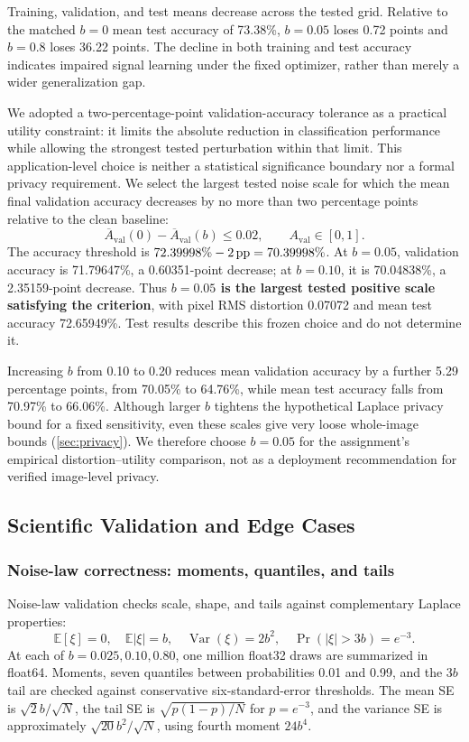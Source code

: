 Training, validation, and test means decrease across the tested grid. Relative to the matched $b=0$ mean test accuracy of 73.38\%, $b=0.05$ loses 0.72 points and $b=0.8$ loses 36.22 points. The decline in both training and test accuracy indicates impaired signal learning under the fixed optimizer, rather than merely a wider generalization gap.

We adopted a two-percentage-point validation-accuracy tolerance as a practical utility constraint: it limits the absolute reduction in classification performance while allowing the strongest tested perturbation within that limit. This application-level choice is neither a statistical significance boundary nor a formal privacy requirement. We select the largest tested noise scale for which the mean final validation accuracy decreases by no more than two percentage points relative to the clean baseline:
\begin{equation}
\overline{A}_{\mathrm{val}}(0)-\overline{A}_{\mathrm{val}}(b)\le0.02,
\qquad A_{\mathrm{val}}\in[0,1].\label{eq:selection}
\end{equation}
The accuracy threshold is $72.39998\%-2\,\text{pp}=70.39998\%$. At $b=0.05$, validation accuracy is 71.79647\%, a 0.60351-point decrease; at $b=0.10$, it is 70.04838\%, a 2.35159-point decrease. Thus \textbf{$b=0.05$ is the largest tested positive scale satisfying the criterion}, with pixel RMS distortion 0.07072 and mean test accuracy 72.65949\%. Test results describe this frozen choice and do not determine it.

Increasing $b$ from 0.10 to 0.20 reduces mean validation accuracy by a further 5.29 percentage points, from 70.05\% to 64.76\%, while mean test accuracy falls from 70.97\% to 66.06\%. Although larger $b$ tightens the hypothetical Laplace privacy bound for a fixed sensitivity, even these scales give very loose whole-image bounds (\cref{sec:privacy}). We therefore choose $b=0.05$ for the assignment's empirical distortion--utility comparison, not as a deployment recommendation for verified image-level privacy.

\subsection{Scientific Validation and Edge Cases}\label{sec:p2validation}
\subsubsection{Noise-law correctness: moments, quantiles, and tails}
Noise-law validation checks scale, shape, and tails against complementary Laplace properties:
\begin{equation}
\mathbb{E}[\xi]=0,\quad \mathbb{E}|\xi|=b,\quad
\operatorname{Var}(\xi)=2b^2,\quad
\Pr(|\xi|>3b)=e^{-3}.\label{eq:moments}
\end{equation}
At each of $b=0.025,0.10,0.80$, one million float32 draws are summarized in float64. Moments, seven quantiles between probabilities 0.01 and 0.99, and the $3b$ tail are checked against conservative six-standard-error thresholds. The mean SE is $\sqrt{2}b/\sqrt{N}$, the tail SE is $\sqrt{p(1-p)/N}$ for $p=e^{-3}$, and the variance SE is approximately $\sqrt{20}b^2/\sqrt{N}$, using fourth moment $24b^4$.


